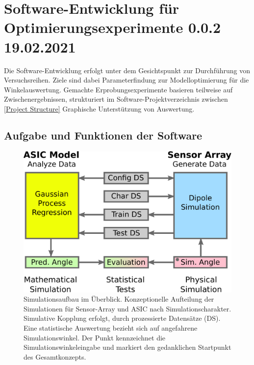 %

\chapter{Software-Entwicklung für Optimierungsexperimente 0.0.2 19.02.2021}\label{ch:sw-entwicklung-f-opt-exp}


Die Software-Entwicklung erfolgt unter dem Gesichtspunkt zur Durchführung von Versuchsreihen. Ziele sind dabei Parameterfindung zur Modelloptimierung für die Winkelauswertung. Gemachte Erprobungsexperimente basieren teilweise auf Zwischenergebnissen, strukturiert im Software-Projektverzeichnis zwischen \autoref{Project Structure}
Graphische Unterstützung von Auswertung.



\section{Aufgabe und Funktionen der Software}\label{sec:aufgabe-und-funktionen-sw}




\begin{figure}[htbp]
	\centering
	\includegraphics[width=0.7\linewidth]{chapters/images/3-SW-E-OExp/Software-Gesamtansicht}
	\caption[Simulationsaufbau im Überblick]{Simulationsaufbau im Überblick. Konzeptionelle Aufteilung der Simulationen für Sensor-Array und ASIC nach Simulationscharakter. Simulative Kopplung erfolgt, durch prozessierte Datensätze (DS). Eine statistische Auswertung bezieht sich auf angefahrene Simulationswinkel. Der Punkt kennzeichnet die Simulationswinkeleingabe und markiert den gedanklichen Startpunkt des Gesamtkonzepts.}
	\label{fig:software-gesamtansicht}
\end{figure}




